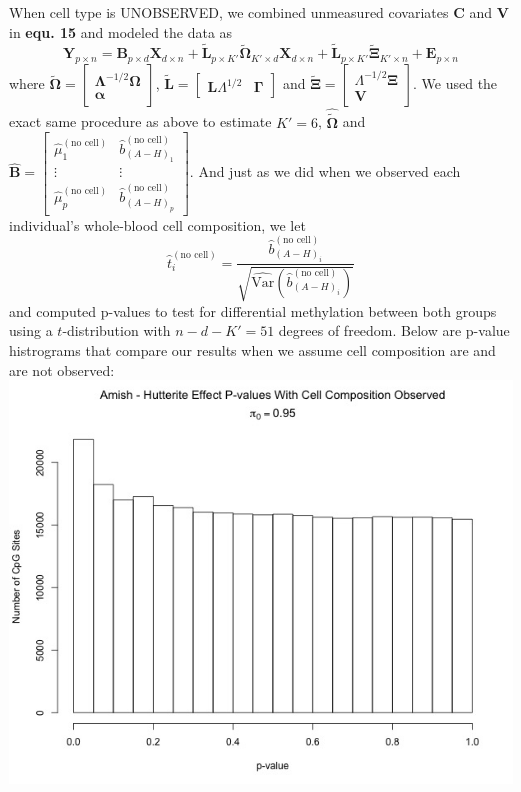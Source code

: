 \documentclass{article}
\begin{document}
\indent When cell type is UNOBSERVED, we combined unmeasured covariates $\bm{C}$ and $\bm{V}$ in \textbf{equ. 15} and modeled the data as
\begin{equation}
\bm{Y}_{p \times n} = \bm{B}_{p \times d}\bm{X}_{d \times n} + \tilde{\bm{L}}_{p \times K'}\tilde{\bm{\Omega}}_{K' \times d}\bm{X}_{d \times n} + \tilde{\bm{L}}_{p \times K'}\tilde{\bm{\Xi}}_{K' \times n} + \bm{E}_{p \times n}
\end{equation}
where $\tilde{\bm{\Omega}} = \left[ \begin{matrix}
\bm{\Lambda}^{-1/2}\bm{\Omega}\\
\bm{\alpha}
\end{matrix} \right]$, $\bm{\tilde{L}} = \left[ \begin{matrix}
\bm{L}\Lambda^{1/2} & \bm{\Gamma}
\end{matrix} \right]$ and $\tilde{\bm{\Xi}} = \left[ \begin{matrix}
\Lambda^{-1/2}\bm{\Xi}\\
\bm{V}
\end{matrix} \right]$. We used the exact same procedure as above to estimate $K' = 6$, $\hat{\tilde{\bm{\Omega}}}$ and $\hat{\bm{B}} = \left[ \begin{matrix}
\hat{\mu}_1^{(\text{no cell})} & \hat{b}_{(A-H)_1}^{(\text{no cell})}\\
\vdots & \vdots\\
\hat{\mu}_p^{(\text{no cell})} & \hat{b}_{(A-H)_p}^{(\text{no cell})}
\end{matrix} \right]$. And just as we did when we observed each individual's whole-blood cell composition, we let
\begin{equation}
\hat{t}_i^{(\text{no cell})} = \frac{\hat{b}_{(A-H)_i}^{(\text{no cell})}}{\sqrt{\hat{\text{Var}}\left( \hat{b}_{(A-H)_i}^{(\text{no cell})} \right)}}
\end{equation}
and computed p-values to test for differential methylation between both groups using a $t$-distribution with $n - d - K' = 51$ degrees of freedom. Below are p-value histrograms that compare our results when we assume cell composition are and are not observed:\\
\includegraphics[scale=0.4]{AmishHutterite_CellPvalues.jpeg}
\end{document}
